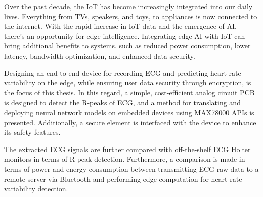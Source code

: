 \noindent Over the past decade, the \ac{IoT} has become increasingly integrated into our daily lives. Everything from TVs, speakers, and toys, to appliances is now connected to the internet. With the rapid increase in \ac{IoT} data and the emergence of AI, there's an opportunity for edge intelligence. Integrating edge AI with IoT can bring additional benefits to systems, such as reduced power consumption, lower latency, bandwidth optimization, and enhanced data security.

\vspace{1em}

\noindent Designing an end-to-end device for recording \ac{ECG} and predicting heart rate variability on the edge, while ensuring user data security through encryption, is the focus of this thesis. In this regard, a simple, cost-efficient analog circuit PCB is designed to detect the R-peaks of ECG, and a method for translating and deploying neural network models on embedded devices using MAX78000 APIs is presented. Additionally, a secure element is interfaced with the device to enhance its safety features. 

\vspace{1em}


\noindent The extracted ECG signals are further compared with off-the-shelf ECG Holter monitors in terms of R-peak detection. Furthermore, a comparison is made in terms of power and energy consumption between transmitting ECG raw data to a remote server via Bluetooth and performing edge computation for heart rate variability detection.

